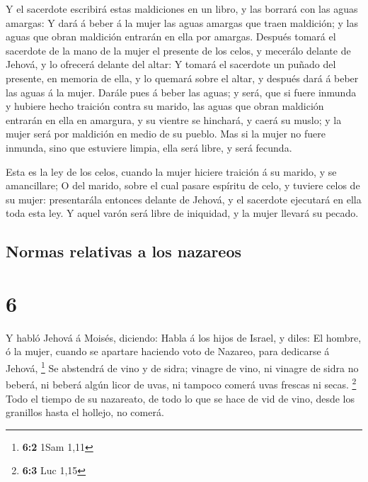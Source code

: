  Y el sacerdote escribirá estas maldiciones en un libro,
y las borrará con las aguas amargas:  Y dará á beber á la
mujer las aguas amargas que traen maldición; y las aguas que obran
maldición entrarán en ella por amargas.  Después tomará
el sacerdote de la mano de la mujer el presente de los celos, y mecerálo
delante de Jehová, y lo ofrecerá delante del altar:  Y
tomará el sacerdote un puñado del presente, en memoria de ella, y lo
quemará sobre el altar, y después dará á beber las aguas á la mujer.
 Darále pues á beber las aguas; y será, que si fuere
inmunda y hubiere hecho traición contra su marido, las aguas que obran
maldición entrarán en ella en amargura, y su vientre se hinchará, y
caerá su muslo; y la mujer será por maldición en medio de su pueblo.
 Mas si la mujer no fuere inmunda, sino que estuviere
limpia, ella será libre, y será fecunda.

 Esta es la ley de los celos, cuando la mujer hiciere
traición á su marido, y se amancillare;  O del marido,
sobre el cual pasare espíritu de celo, y tuviere celos de su mujer:
presentarála entonces delante de Jehová, y el sacerdote ejecutará en
ella toda esta ley.  Y aquel varón será libre de
iniquidad, y la mujer llevará su pecado.

\hypertarget{normas-relativas-a-los-nazareos}{%
\subsection{Normas relativas a los
nazareos}\label{normas-relativas-a-los-nazareos}}

\hypertarget{section-5}{%
\section{6}\label{section-5}}

 Y habló Jehová á Moisés, diciendo:  Habla á
los hijos de Israel, y diles: El hombre, ó la mujer, cuando se apartare
haciendo voto de Nazareo, para dedicarse á Jehová, \footnote{\textbf{6:2}
  1Sam 1,11}  Se abstendrá de vino y de sidra; vinagre de
vino, ni vinagre de sidra no beberá, ni beberá algún licor de uvas, ni
tampoco comerá uvas frescas ni secas. \footnote{\textbf{6:3} Luc 1,15}
 Todo el tiempo de su nazareato, de todo lo que se hace de
vid de vino, desde los granillos hasta el hollejo, no comerá.

